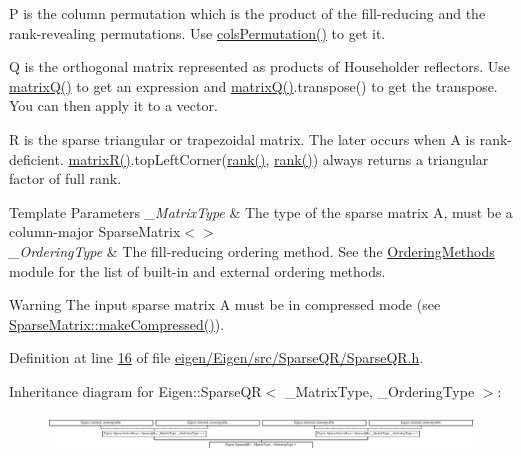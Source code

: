 P is the column permutation which is the product of the fill-\/reducing and the rank-\/revealing permutations. Use \hyperlink{group___sparse_q_r___module_a140930ebbf89dfd57a173761716db38f}{cols\+Permutation()} to get it.

Q is the orthogonal matrix represented as products of Householder reflectors. Use \hyperlink{group___sparse_q_r___module_ae1cc0a836c177d4f42600f8639354be1}{matrix\+Q()} to get an expression and \hyperlink{group___sparse_q_r___module_ae1cc0a836c177d4f42600f8639354be1}{matrix\+Q()}.transpose() to get the transpose. You can then apply it to a vector.

R is the sparse triangular or trapezoidal matrix. The later occurs when A is rank-\/deficient. \hyperlink{group___sparse_q_r___module_a564524ff13b2b6dd1e76127404f7b920}{matrix\+R()}.top\+Left\+Corner(\hyperlink{group___sparse_q_r___module_a70ec2b9e5cb62a41dc1ee2adfb54e9b0}{rank()}, \hyperlink{group___sparse_q_r___module_a70ec2b9e5cb62a41dc1ee2adfb54e9b0}{rank()}) always returns a triangular factor of full rank.


\begin{DoxyTemplParams}{Template Parameters}
{\em \+\_\+\+Matrix\+Type} & The type of the sparse matrix A, must be a column-\/major Sparse\+Matrix$<$$>$ \\
\hline
{\em \+\_\+\+Ordering\+Type} & The fill-\/reducing ordering method. See the \hyperlink{group___ordering_methods___module}{Ordering\+Methods } module for the list of built-\/in and external ordering methods.\\
\hline
\end{DoxyTemplParams}


\begin{DoxyWarning}{Warning}
The input sparse matrix A must be in compressed mode (see \hyperlink{group___sparse_core___module_a5ff54ffc10296f9466dc81fa888733fd}{Sparse\+Matrix\+::make\+Compressed()}). 
\end{DoxyWarning}


Definition at line \hyperlink{eigen_2_eigen_2src_2_sparse_q_r_2_sparse_q_r_8h_source_l00016}{16} of file \hyperlink{eigen_2_eigen_2src_2_sparse_q_r_2_sparse_q_r_8h_source}{eigen/\+Eigen/src/\+Sparse\+Q\+R/\+Sparse\+Q\+R.\+h}.

Inheritance diagram for Eigen\+:\+:Sparse\+QR$<$ \+\_\+\+Matrix\+Type, \+\_\+\+Ordering\+Type $>$\+:\begin{figure}[H]
\begin{center}
\leavevmode
\includegraphics[height=0.967742cm]{group___sparse_q_r___module}
\end{center}
\end{figure}
